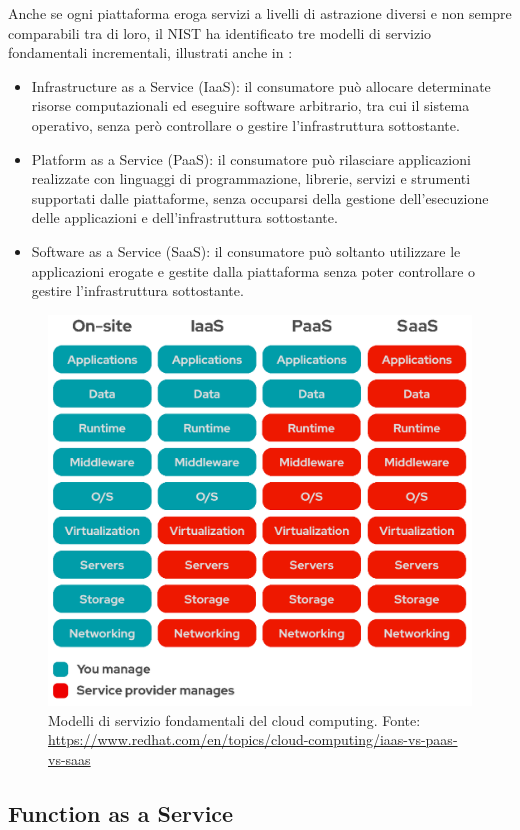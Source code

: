 Anche se ogni piattaforma eroga servizi a livelli di astrazione diversi e non sempre comparabili tra di loro, il NIST ha identificato tre modelli di servizio fondamentali incrementali, illustrati anche in :

\begin{itemize}
    \item Infrastructure as a Service (IaaS): il consumatore può allocare determinate risorse computazionali ed eseguire software arbitrario, tra cui il sistema operativo, senza però controllare o gestire l'infrastruttura sottostante.

    \item Platform as a Service (PaaS): il consumatore può rilasciare applicazioni realizzate con linguaggi di programmazione, librerie, servizi e strumenti supportati dalle piattaforme, senza occuparsi della gestione dell'esecuzione delle applicazioni e dell'infrastruttura sottostante.
    
    \item Software as a Service (SaaS): il consumatore può soltanto utilizzare le applicazioni erogate e gestite dalla piattaforma senza poter controllare o gestire l'infrastruttura sottostante.
\end{itemize}

\begin{figure}
    \centering
    \includegraphics[width=.6\linewidth]{assets/2/cloud_level_services.png}
    \caption[Modelli di servizio fondamentali del cloud computing.]{Modelli di servizio fondamentali del cloud computing. Fonte: \url{https://www.redhat.com/en/topics/cloud-computing/iaas-vs-paas-vs-saas}}
    \label{fig:2_cloud_level_services}
\end{figure}

\subsection{Function as a Service}

